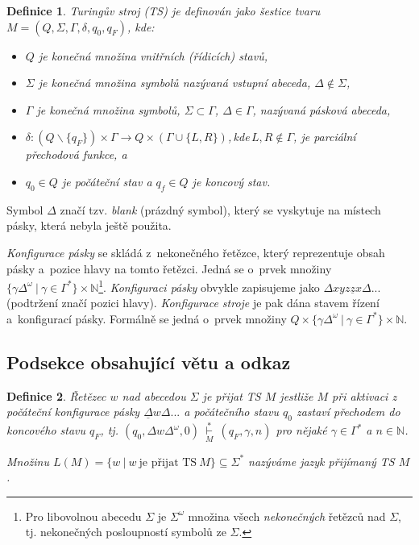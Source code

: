 \documentclass[twocolumn,11pt]{article}
\theoremstyle{plain}
\newtheorem{deft}{Definice}
\begin{document}
\begin{deft}
\label{deft:turinguv_stroj}
{\normalfont Turingův stroj} (TS) je definován jako šestice tvaru $M = (Q, \Sigma, \Gamma, \delta, q_0, q_F)$, kde:
\begin{itemize}
    \setlength{\itemsep}{0.05em}
    \item $Q$ je konečná množina {\normalfont vnitřních (řídicích) stavů},
    \item $\Sigma$ je konečná množina symbolů nazývaná {\normalfont vstupní abeceda}, $\Delta \not\in \Sigma$,
    \item $\Gamma$ je konečná množina symbolů, $\Sigma \subset \Gamma$, $\Delta \in \Gamma$, nazývaná {\normalfont pásková abeceda},
    \item $\delta : (Q\backslash\{q_F\})\!\times\!\Gamma \rightarrow Q\!\times\!(\Gamma\!\cup\!\{L, R\})$,\,kde\,$L,R \not\in \Gamma$, je parciální {\normalfont přechodová funkce}, a
    \item $q_0 \in Q$ je {\normalfont počáteční stav} a $q_f \in Q$ je {\normalfont koncový stav}.
\end{itemize}
\end{deft}

Symbol $\Delta$ značí tzv. \emph{blank} (prázdný symbol), který se vyskytuje na místech pásky, která nebyla ještě použita.

\emph{Konfigurace pásky} se skládá z~nekonečného řetězce, který reprezentuje obsah pásky a~pozice hlavy na tomto řetězci. Jedná se o~prvek množiny $\{\gamma\Delta^\omega\ |\ \gamma\in\Gamma^*\} \times \mathbb{N}$\footnote{Pro libovolnou abecedu $\Sigma$ je $\Sigma^\omega$ množina všech \emph{nekonečných} řetězců nad $\Sigma$, tj. nekonečných posloupností symbolů ze $\Sigma$.}. \emph{Konfiguraci pásky} obvykle zapisujeme jako $\Delta xyz\underline{z}x \Delta...$ (podtržení značí pozici hlavy). \emph{Konfigurace stroje} je pak dána stavem řízení a~konfigurací pásky. Formálně se jedná o~prvek množiny $Q \times \{\gamma\Delta^\omega\ |\ \gamma\in\Gamma^*\} \times \mathbb{N}$.

\subsection{Podsekce obsahující větu a odkaz}
\begin{deft}
\label{deft:retezec}
{\normalfont Řetězec $w$ nad abecedou $\Sigma$ je přijat TS $M$} jestliže $M$ při aktivaci z počáteční konfigurace pásky $\underline{\Delta}w\Delta...$ a počátečního stavu $q_0$ zastaví přechodem do koncového stavu $q_F$, tj. $(q_0, \Delta w \Delta^\omega,0)\ \mathop{\vdash}\limits_{M}^{*}\ (q_F,\gamma,n)$ pro nějaké $\gamma \in \Gamma^*$ a $n \in \mathbb{N}$.

Množinu $L(M) = \{w\ |\ w\ \text{je přijat TS}\ M\} \subseteq \Sigma^*$ nazýváme {\normalfont jazyk přijímaný TS} $M$.
\end{deft}
\end{document}
